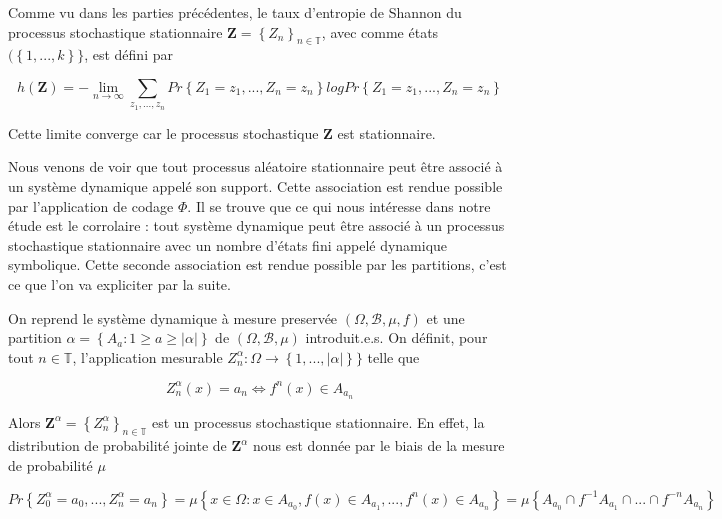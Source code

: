 Comme vu dans les parties précédentes, le taux d'entropie de Shannon du processus stochastique stationnaire $\textbf{Z}=\left\{Z_n\right\}_{n\in\mathbb{T}}$, avec comme états $(\left\{1,...,k\right\}\}$, est défini par

\begin{equation}
    h(\textbf{Z})=-\lim_{n \to \infty}\sum_{z_1,...,z_n}Pr\left\{Z_1=z_1, ...,Z_n=z_n\right\}logPr\left\{Z_1=z_1, ...,Z_n=z_n\right\}
\end{equation}

Cette limite converge car le processus stochastique $\textbf{Z}$ est stationnaire. 

\vspace{2ex}
Nous venons de voir que tout processus aléatoire stationnaire peut être associé à un système dynamique appelé son support. Cette association est rendue possible par l'application de codage $\Phi$. Il se trouve que ce qui nous intéresse dans notre étude est le corrolaire : tout système dynamique peut être associé à un processus stochastique stationnaire avec un nombre d'états fini appelé dynamique symbolique. Cette seconde association est rendue possible par les partitions, c'est ce que l'on va expliciter par la suite.

\vspace{2ex}
On reprend le système dynamique à mesure preservée $(\Omega,\mathcal{B},\mu,f)$ et une partition $\alpha = \left\{A_a : 1 \geq a \geq |\alpha|\right\}$ de $(\Omega,\mathcal{B},\mu)$ introduit.e.s. On définit, pour tout $n \in \mathbb{T}$, l'application mesurable $Z_n^{\alpha}: \Omega \longrightarrow \left\{1,...,|\alpha|\right\}\}$ telle que

\begin{equation}
    Z_n^{\alpha}(x)=a_n \iff f^n(x)\in A_{a_n}
\end{equation}

Alors $\textbf{Z}^{\alpha}=\left\{Z_n^{\alpha}\right\}_{n\in\mathbb{T}}$ est un processus stochastique stationnaire. En effet, la distribution de probabilité jointe de $\textbf{Z}^{\alpha}$ nous est donnée par le biais de la mesure de probabilité $\mu$

\begin{equation}
    Pr \left\{ Z_0^{\alpha}=a_0, ...,Z_n^{\alpha}=a_n \right\} = \mu \left\{ x \in \Omega :x \in A_{a_0},f(x) \in A_{a_1},...,f^n(x) \in A_{a_n}\right\} = \mu\left\{A_{a_0} \cap f^{-1}A_{a_1} \cap...\cap f^{-n}A_{a_n}\right\}
\end{equation}

